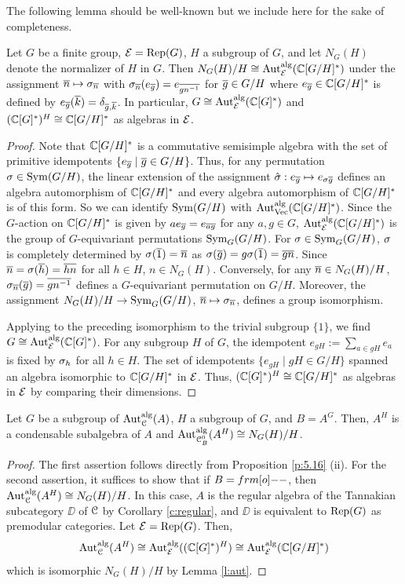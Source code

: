 \documentclass{amsart}
\begin{document}
 The following lemma should be well-known but we include here for the sake of completeness.
 \begin{lem} \label{l:aut}
     Let $G$ be a finite group, $\mathcal{E}=\operatorname{Rep}(G)$, $H$ a subgroup of $G$, and let $N_G(H)$ denote the normalizer of $H$ in $G$. Then $N_G(H)/H \cong {\rm Aut}_{\mathcal{E}}^{\operatorname{alg}}(\mathbb{C}[G/H]^*)$ under the assignment $\overline n \mapsto \sigma_{\overline n}$ with $\sigma_{\overline n}(e_{\overline g}) = e_{\overline {gn^{-1}}}$ for $\overline g \in G/H$ where $e_{\overline g} \in \mathbb{C}[G/H]^*$ is defined by $e_{\overline g}(\overline k) = \delta_{\overline g, \overline k}$. In particular, $G \cong {\rm Aut}_{\mathcal{E}}^{\operatorname{alg}}(\mathbb{C}[G]^*)$ and $(\mathbb{C}[G]^*)^H \cong \mathbb{C}[G/H]^*$ as algebras in  $\mathcal{E}$.
 \end{lem}
 \begin{proof}
     Note that $\mathbb{C}[G/H]^*$ is a commutative semisimple algebra with the set of primitive idempotents $\{e_{\overline g}\mid \overline g \in G/H\}$. Thus, for any permutation $ \sigma \in \operatorname{Sym}(G/H)$, the linear extension of the assignment $\hat \sigma : e_{\overline g} \mapsto e_{\sigma \overline g}$ defines an algebra automorphism of $\mathbb{C}[G/H]^*$ and every algebra automorphism of $\mathbb{C}[G/H]^*$ is of this form. So we can identify $\operatorname{Sym}(G/H)$ with ${\rm Aut}_{\operatorname{Vec}}^{\operatorname{alg}}(\mathbb{C}[G/H]^*)$. Since the $G$-action on $\mathbb{C}[G/H]^*$ is given by $ae_{\overline g} = e_{\overline{ag}}$ for any $a, g \in G$, ${\rm Aut}_{\mathcal{E}}^{\operatorname{alg}}(\mathbb{C}[G/H]^*)$ is the group of $G$-equivariant permutations $\operatorname{Sym}_G(G/H)$.
     For $\sigma \in \operatorname{Sym}_G(G/H)$, $\sigma$ is completely determined by $\sigma(\overline 1) = \overline n$ as $\sigma(\overline g) = g \sigma(\overline 1) = \overline {gn}$. Since $\overline n= \sigma(\overline h) =  \overline{hn}$ for all $h \in H$, $n \in N_G(H)$. Conversely, for any $\overline n \in N_G(H)/H$, $\sigma_{\overline n} (\overline g) = \overline {g n^{-1}}$ defines a $G$-equivariant permutation on $G/H$. Moreover, the assignment $N_G(H)/H \to \operatorname{Sym}_G(G/H)$, $\overline n \mapsto \sigma_{\overline n}$, defines a group isomorphism.

     Applying to the preceding isomorphism to the trivial subgroup $\{1\}$, we find  $G \cong {\rm Aut}_{\mathcal{E}}^{\operatorname{alg}}(\mathbb{C}[G]^*)$. For any subgroup $H$ of $G$,  the idempotent $e_{gH}:=\sum_{a \in gH} e_a$ is fixed by $\sigma_h$ for all $h \in H$. The set of idempotents $\{e_{gH} \mid gH \in G/H\}$ spanned an algebra isomorphic to $\mathbb{C}[G/H]^*$ in $\mathcal{E}$. Thus, $(\mathbb{C}[G]^*)^H \cong \mathbb{C}[G/H]^*$ as algebras in $\mathcal{E}$ by comparing their dimensions.
 \end{proof}
 \begin{cor}\label{c:xu}
      Let $G$ be a subgroup of  ${\operatorname{Aut}_{\EuScript{C}}^{\operatorname{alg}}}(A)$, $H$ a subgroup of $G$, and $B = A^G$. Then, $A^H$ is a condensable subalgebra of $A$ and ${\rm Aut}_{{{\EuScript{C}}_B^0}}^{\operatorname{alg}}(A^H) \cong N_G(H)/H$.
 \end{cor}
 \begin{proof}
     The first assertion follows directly from Proposition \ref{p:5.16} (ii). For the second assertion, it suffices to show that if $B=\1$, then ${\operatorname{Aut}_{\EuScript{C}}^{\operatorname{alg}}}(A^H) \cong N_G(H)/H$. In this case, $A$ is the regular algebra of the Tannakian subcategory $\DD$ of ${\EuScript{C}}$ by Corollary \ref{c:regular}, and $\DD$ is equivalent to $\operatorname{Rep}(G)$ as premodular categories. Let $\mathcal{E} = \operatorname{Rep}(G)$. Then, 
     $$
     {\operatorname{Aut}_{\EuScript{C}}^{\operatorname{alg}}}(A^H) \cong {\rm Aut}_{\mathcal{E}}^{\operatorname{alg}}((\mathbb{C}[G]^*)^H) \cong {\rm Aut}_{\mathcal{E}}^{\operatorname{alg}}(\mathbb{C}[G/H]^*)  
     $$
     which is isomorphic $N_G(H)/H$ by Lemma \ref{l:aut}.
 \end{proof}
\end{document}
